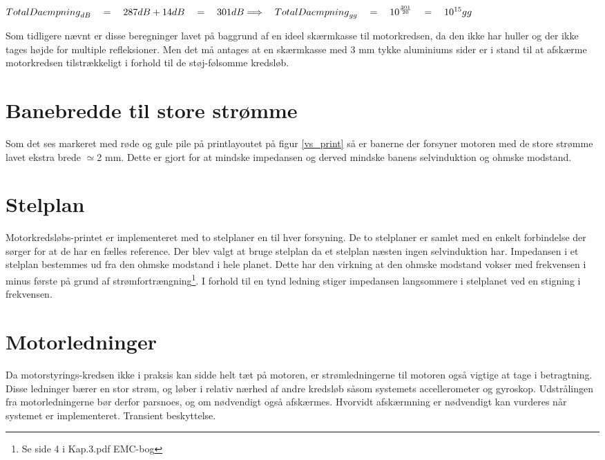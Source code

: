 ${ TotalDaempning }_{ dB }\quad =\quad 287dB+14dB\quad =\quad 301dB\\ \Longrightarrow \quad { { TotalDaempning } }_{ gg }\quad =\quad { 10 }^{ \frac { 301 }{ 20 }  }\quad =\quad { 10 }^{ 15 }gg$

Som tidligere nævnt er disse beregninger lavet på baggrund af en ideel skærmkasse til motorkredsen, da den ikke har huller og der ikke tages højde for multiple refleksioner. Men det må antages at en skærmkasse med 3 mm tykke aluminiums sider er i stand til at afskærme motorkredsen tilstrækkeligt i forhold til de støj-følsomme kredsløb.

\section{Banebredde til store strømme}

Som det ses markeret med røde og gule pile på printlayoutet på figur \ref{vs_print} så er banerne der forsyner motoren med de store strømme lavet ekstra brede $\simeq$2 mm. Dette er gjort for at mindske impedansen og derved mindske banens selvinduktion og ohmske modstand.

\section{Stelplan}

Motorkredsløbs-printet er implementeret med to stelplaner en til hver forsyning. De to stelplaner er samlet med en enkelt forbindelse der sørger for at de har en fælles reference. Der blev valgt at bruge stelplan da et stelplan næsten ingen selvinduktion har. Impedansen i et stelplan bestemmes ud fra den ohmske modstand i hele planet. Dette har den virkning at den ohmske modstand vokser med frekvensen i minus første på grund af strømfortrængning\footnote{Se side 4 i Kap.3.pdf EMC-bog}. I forhold til en tynd ledning stiger impedansen langsommere i stelplanet ved en stigning i frekvensen. 

\section{Motorledninger}

Da motorstyrings-kredsen ikke i praksis kan sidde helt tæt på motoren, er strømledningerne til motoren også vigtige at tage i betragtning. Disse ledninger bærer en stor strøm, og løber i relativ nærhed af andre kredsløb såsom systemets accellerometer og gyroskop. Udstrålingen fra motorledningerne bør derfor parsnoes, og om nødvendigt også afskærmes. Hvorvidt afskærmning er nødvendigt kan vurderes når systemet er implementeret. 
Transient beskyttelse.
